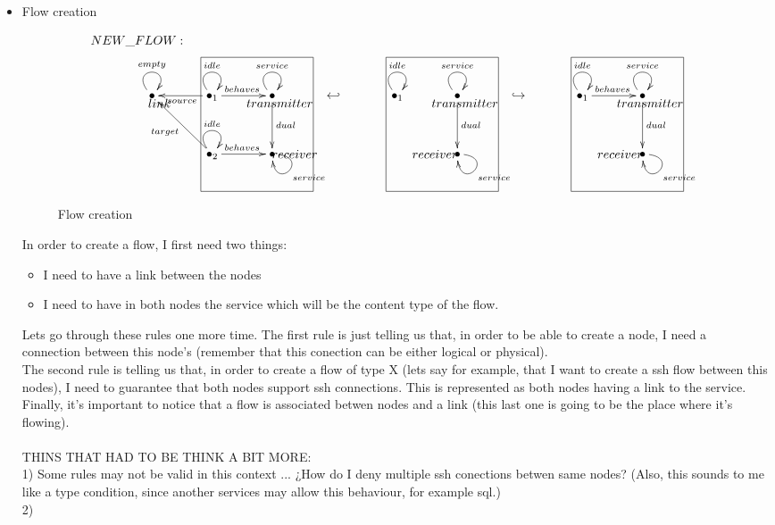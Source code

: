 \documentclass[envcountsect,runningheads]{llncs}
\begin{document}
  \begin{itemize}
    \item Flow creation
  \begin{figure}[H]
    \[
       \xymatrix@C=35pt@R=35pt
       {
         {}\POS[]-<1pc,0pc>\drop{NEW\_FLOW:}
         \\
         {\bullet} \ar@(ul,ur)^{empty} \POS[]-<-0.5pc,.5pc> \drop{link} &
         {\bullet}_{1} \ar@(ul,ur)^{idle} \ar@{->}^{behaves}[r] \ar@{->}^{source}[l] &
         {\bullet} \ar@(ul,ur)^{service} \ar@{->}^{dual}[d] \POS[]-<-0.5pc,.5pc> \drop{transmitter}
         & {\hookleftarrow} &
         {\bullet}_{1} \ar@(ul,ur)^{idle} &
         {\bullet} \ar@(ul,ur)^{service} \ar@{->}^{dual}[d] \POS[]-<-0.5pc,.5pc> \drop{transmitter}
         & {\hookrightarrow} &
         {\bullet}_{1} \ar@(ul,ur)^{idle}\ar@{->}^{behaves}[r]
         &
         {\bullet} \ar@(ul,ur)^{service} \ar@{->}^{dual}[d] \POS[]-<-0.5pc,.5pc> \drop{transmitter}
         \\
         &
         {\bullet}_{2} \ar@(ul,ur)^{idle}\ar@{->}^{behaves}[r] \ar@{->}^{target}[ul] & 
         {\bullet} \ar@(r,d)^{service} \POS[]-<-1.5pc,0pc> \drop{receiver}
         \POS[]+<-1pc,2pc> *+=<7.5pc,9pc>[F-]{} & & &
         {\bullet} \ar@(r,d)^{service} \POS[]-<1.5pc,0pc> \drop{receiver}
         \POS[]+<-1pc,2pc> *+=<7.5pc,9pc>[F-]{} & & &
         {\bullet} \ar@(r,d)^{service} \POS[]-<1.5pc,0pc> \drop{receiver}
         \POS[]+<-1pc,2pc> *+=<7.5pc,9pc>[F-]{}
       }
    \]
    \caption{Flow creation}
    \protect\label{fig:flowcreation}
  \end{figure}
  In order to create a flow, I first need two things: 
  \begin{itemize}
    \item I need to have a link between the nodes
    \item I need to have in both nodes the service which will be the content type of the flow.  
   \end{itemize}
  
  Lets go through these rules one more time. The first rule is just telling us that, in order to be able to
  create a node, I need a connection between this node's (remember that this conection can be either
  logical or physical).\\
  The second rule is telling us that, in order to create a flow of type X (lets say for example, 
  that I want to create a ssh flow between this nodes), I need to guarantee that 
  both nodes support ssh connections. This is represented as both nodes having 
  a link to the service. \\
  Finally, it's important to notice that a flow is associated betwen nodes and a link 
  (this last one is going to be the place where it's flowing).\\
  \\
  THINS THAT HAD TO BE THINK A BIT MORE: \\
  1) Some rules may not be valid in this context ... ¿How do I deny multiple ssh 
  conections betwen same nodes? (Also, this sounds to me like a type condition, since another
  services may allow this behaviour, for example sql.) \\
  2) 
 

\end{itemize}
\end{document}
